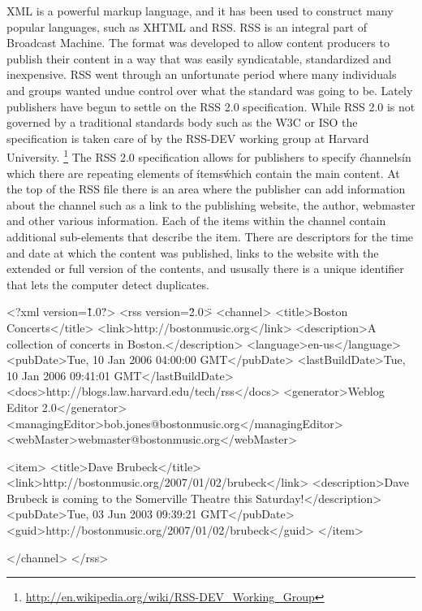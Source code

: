\documentclass[a4paper,12pt]{report}
\begin{document}
XML is a powerful markup language, and it has been used to construct many popular languages, such as XHTML and RSS.
RSS is an integral part of Broadcast Machine.
The format was developed to allow content producers to publish their content in a way that was easily syndicatable, standardized and inexpensive.
RSS went through an unfortunate period where many individuals and groups wanted undue control over what the standard was going to be.
Lately publishers have begun to settle on the RSS 2.0 specification.
While RSS 2.0 is not governed by a traditional standards body such as 
the W3C or ISO the specification is taken care of by the RSS-DEV working 
group at Harvard University. \footnote{\url{http://en.wikipedia.org/wiki/RSS-DEV\_Working\_Group}}
The RSS 2.0 specification allows for publishers to specify \'channels\' in which there are repeating elements of \'items\' which contain the main content.
At the top of the RSS file there is an area where the publisher can add information about the channel such as a link to the publishing website, the author, webmaster and other various information.
Each of the items within the channel contain additional sub-elements that describe the item.
There are descriptors for the time and date at which the content was published, links to the website with the extended or full version of the contents, and ususally there is a unique identifier that lets the computer detect duplicates. 

<?xml version=\"1.0\"?>
<rss version=\"2.0\">
  <channel>
    <title>Boston Concerts</title>
    <link>http://bostonmusic.org</link>
    <description>A collection of concerts in Boston.</description>
    <language>en-us</language>
    <pubDate>Tue, 10 Jan 2006 04:00:00 GMT</pubDate>
    <lastBuildDate>Tue, 10 Jan 2006 09:41:01 GMT</lastBuildDate>
    <docs>http://blogs.law.harvard.edu/tech/rss</docs>
    <generator>Weblog Editor 2.0</generator>
    <managingEditor>bob.jones@bostonmusic.org</managingEditor>
    <webMaster>webmaster@bostonmusic.org</webMaster>

    <item>
      <title>Dave Brubeck</title>
      <link>http://bostonmusic.org/2007/01/02/brubeck</link>
      <description>Dave Brubeck is coming to the Somerville Theatre this Saturday!</description>
      <pubDate>Tue, 03 Jun 2003 09:39:21 GMT</pubDate>
      <guid>http://bostonmusic.org/2007/01/02/brubeck</guid>
    </item>

  </channel>
</rss>
\end{document}
